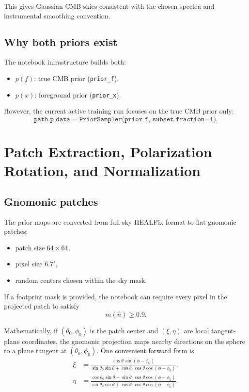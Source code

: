 \documentclass[11pt]{article}
\begin{document}
This gives Gaussian CMB skies consistent with the chosen spectra and instrumental smoothing convention.

\subsection{Why both priors exist}

The notebook infrastructure builds both:
\begin{itemize}[leftmargin=1.5em]
  \item \(p(f)\): true CMB prior (\texttt{prior\_f}),
  \item \(p(x)\): foreground prior (\texttt{prior\_x}).
\end{itemize}

However, the current active training run focuses on the true CMB prior only:
\begin{equation}
  \texttt{path.p\_data} = \texttt{PriorSampler(prior\_f, subset\_fraction=1)}.
\end{equation}

\section{Patch Extraction, Polarization Rotation, and Normalization}

\subsection{Gnomonic patches}

The prior maps are converted from full-sky HEALPix format to flat gnomonic patches:
\begin{itemize}[leftmargin=1.5em]
  \item patch size \(64 \times 64\),
  \item pixel size \(6.7'\),
  \item random centers chosen within the sky mask.
\end{itemize}

If a footprint mask is provided, the notebook can require every pixel in the projected patch to satisfy
\begin{equation}
  m(\hat n) \ge 0.9.
\end{equation}

Mathematically, if \((\theta_0,\phi_0)\) is the patch center and \((\xi,\eta)\) are local tangent-plane coordinates, the gnomonic projection maps nearby directions on the sphere to a plane tangent at \((\theta_0,\phi_0)\). One convenient forward form is
\begin{align}
  \xi &=
  \frac{\cos\theta\,\sin(\phi-\phi_0)}
       {\sin\theta_0\sin\theta+\cos\theta_0\cos\theta\cos(\phi-\phi_0)},\\
  \eta &=
  \frac{\cos\theta_0\sin\theta-\sin\theta_0\cos\theta\cos(\phi-\phi_0)}
       {\sin\theta_0\sin\theta+\cos\theta_0\cos\theta\cos(\phi-\phi_0)}.
\end{align}
\end{document}
